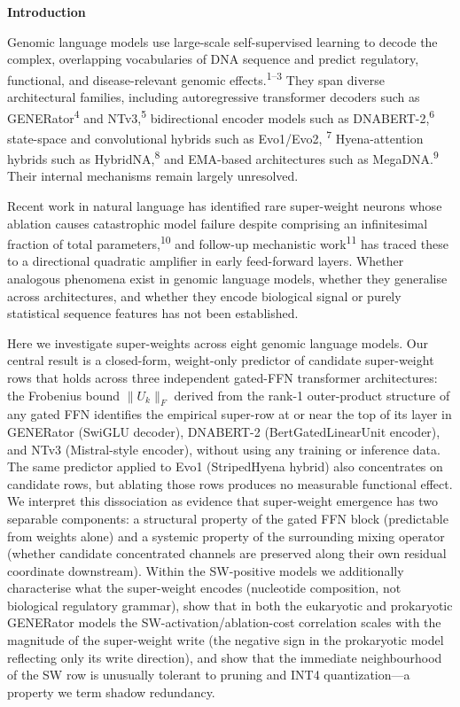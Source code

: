 \documentclass[11pt]{article}
\begin{document}
\textbf{Introduction}

Genomic language models use large-scale self-supervised learning to
decode the complex, overlapping vocabularies of DNA sequence and
predict regulatory, functional, and disease-relevant genomic
effects.\textsuperscript{1--3} They span diverse architectural
families, including autoregressive transformer decoders such as
GENERator\textsuperscript{4} and NTv3,\textsuperscript{5}
bidirectional encoder models such as DNABERT-2,\textsuperscript{6}
state-space and convolutional hybrids such as Evo1/Evo2,
\textsuperscript{7} Hyena-attention hybrids such as
HybridNA,\textsuperscript{8} and EMA-based architectures such as
MegaDNA.\textsuperscript{9} Their internal mechanisms remain largely
unresolved.

Recent work in natural language has identified rare super-weight
neurons whose ablation causes catastrophic model failure despite
comprising an infinitesimal fraction of total
parameters,\textsuperscript{10} and follow-up mechanistic
work\textsuperscript{11} has traced these to a directional quadratic
amplifier in early feed-forward layers. Whether analogous phenomena
exist in genomic language models, whether they generalise across
architectures, and whether they encode biological signal or purely
statistical sequence features has not been established.

Here we investigate super-weights across eight genomic language
models. Our central result is a closed-form, weight-only predictor
of candidate super-weight rows that holds across three independent
gated-FFN transformer architectures: the Frobenius bound
$\|U_k\|_F$ derived from the rank-1 outer-product structure of any
gated FFN identifies the empirical super-row at or near the top of
its layer in GENERator (SwiGLU decoder), DNABERT-2 (BertGatedLinearUnit
encoder), and NTv3 (Mistral-style encoder), without using any
training or inference data. The same predictor applied to Evo1
(StripedHyena hybrid) also concentrates on candidate rows, but
ablating those rows produces no measurable functional effect. We
interpret this dissociation as evidence that super-weight emergence
has two separable components: a structural property of the gated
FFN block (predictable from weights alone) and a systemic property
of the surrounding mixing operator (whether candidate concentrated
channels are preserved along their own residual coordinate
downstream). Within the SW-positive models we additionally
characterise what the super-weight encodes (nucleotide composition,
not biological regulatory grammar), show that in both the eukaryotic
and prokaryotic GENERator models the SW-activation/ablation-cost
correlation scales with the magnitude of the super-weight write (the
negative sign in the prokaryotic model reflecting only its write
direction), and show that the immediate
neighbourhood of the SW row is unusually tolerant to pruning and
INT4 quantization---a property we term shadow redundancy.
\end{document}
